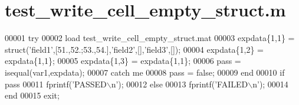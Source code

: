 \hypertarget{test__write__cell__empty__struct_8m_source}{}\section{test\+\_\+write\+\_\+cell\+\_\+empty\+\_\+struct.\+m}
\label{test__write__cell__empty__struct_8m_source}

\begin{DoxyCode}
00001 \textcolor{keywordflow}{try}
00002     load test\_write\_cell\_empty\_struct.mat
00003     expdata\{1,1\} = \textcolor{keyword}{struct}(\textcolor{stringliteral}{'field1'},[51.,52.;53.,54.],\textcolor{stringliteral}{'field2'},[],\textcolor{stringliteral}{'field3'},[]);
00004     expdata\{1,2\} = expdata\{1,1\};
00005     expdata\{1,3\} = expdata\{1,1\};
00006     pass = isequal(var1,expdata);
00007 \textcolor{keywordflow}{catch} me
00008     pass = \textcolor{keyword}{false};
00009 end
00010 \textcolor{keywordflow}{if} pass
00011     fprintf(\textcolor{stringliteral}{'PASSED\(\backslash\)n'});
00012 \textcolor{keywordflow}{else}
00013     fprintf(\textcolor{stringliteral}{'FAILED\(\backslash\)n'});
00014 end
00015 exit;
\end{DoxyCode}

